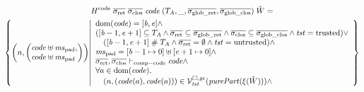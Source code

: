 \documentclass[a4paper]{article}
\begin{document}
\begin{multline*}
  H^\mathrm{code} \; \sigrets \; \sigcloss \; \code \; (\ta,\_,\gsigrets,\gsigcloss) \; \hat{W} =\\
  \left\{\npair{\arraycolsep=0pt\left(\array{l}\code \uplus \mspad,\\ \code \uplus \mspad\endarray\right)} \middle|
    \begin{array}{l}
    \dom(\code) = [\baddr,\eaddr] \wedge \\
      ([\baddr - 1, \eaddr + 1] \subseteq \ta \wedge \sigrets \subseteq \gsigrets \wedge \sigcloss \subseteq \gsigcloss \wedge \trust = \trusted) \vee \\
      \quad ([\baddr-1,\eaddr+1]\mathrel{\#} \ta \wedge \sigrets = \emptyset \wedge \trust =\untrusted) \wedge \\
      \mspad = [\baddr-1 \mapsto 0] \uplus [\eaddr + 1 \mapsto 0]\wedge\\
      \sigrets,\sigcloss \vdash_{\mathrm{comp-code}} \code \wedge\\
      \forall a \in \dom(\code)\ldotp\\
      \quad\npair{(\code(a),\code(a))} \in \lrvg{\trust}(\purePart{\xi(\hat{W})}) \wedge
    \end{array}
  \right\}
\end{multline*}
\end{document}
